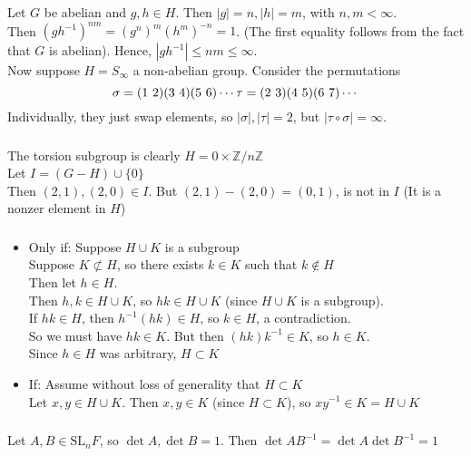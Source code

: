 \documentclass{article}
\newcommand{\ints}{\mathbb{Z}}
\newcommand{\set}[1]{ \{ #1 \} }
\newcommand{\inv}[1]{ {#1}^{-1} }
\newcommand{\comp}{ \circ }
\begin{document}
\subsubsection{}\label{ex1p6}
Let $G$ be abelian and $g,h \in H$. Then $|g|=n,|h|=m$, with $n,m<\infty$.\\
Then $(g\inv{h})^{nm} = (g^n)^m(h^m)^{-n} = 1$. (The first equality follows from the fact that $G$ is abelian). Hence, $|g\inv{h}| \leq nm \leq \infty$.\\
Now suppose $H=S_{\infty}$ a non-abelian group. Consider the permutations
\begin{equation}
\sigma = (1\ 2)(3\ 4)(5\ 6)\cdots\\
\tau = (2\ 3)(4\ 5)(6\ 7)\cdots
\end{equation}
Individually, they just swap elements, so $|\sigma|,|\tau| = 2$, but $|\tau\comp\sigma| = \infty$. 
\subsubsection{}\label{ex1p7}
The torsion subgroup is clearly $H= 0\times \ints/n\ints$\\
Let $I = (G-H)\cup\set{0}$\\
Then $(2,1),(2,0)\in I$. But $(2,1)-(2,0) = (0,1)$, is not in $I$ (It is a nonzer element in $H$)
\subsubsection{}\label{ex1p8}
\begin{itemize}
\item Only if: Suppose $H\cup K$ is a subgroup\\
Suppose $K\not\subset H$, so there exists $k\in K$ such that $k\notin H$\\
Then let $h \in H$.\\
Then $h,k\in H\cup K$, so $hk\in H\cup K$ (since $H\cup K$ is a subgroup).\\
If $hk \in H$, then $\inv{h}(hk) \in H$, so $k\in H$, a contradiction.\\
So we must have $hk \in K$. But then $(hk)\inv{k} \in K$, so $h\in K$.\\
Since $h\in H$ was arbitrary, $H \subset K$
\item If: Assume without loss of generality that $H \subset K$\\
Let $x,y \in H\cup K$. Then $x,y\in K$ (since $H\subset K$), so $x\inv{y} \in K = H\cup K$
\end{itemize}
\subsubsection{}\label{ex1p9}
Let $A,B\in \textrm{SL}_nF$, so $\det A, \det B =1$. Then $\det A\inv{B} = \det A \det \inv{B} = 1$
\end{document}
